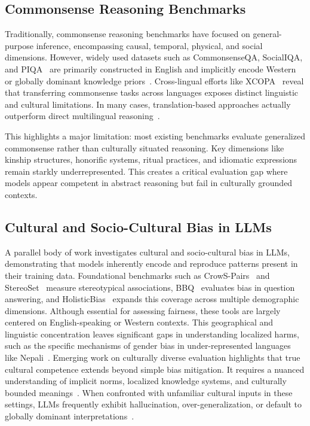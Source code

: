 \documentclass[10pt, a4paper]{article}
\begin{document}
\subsection{Commonsense Reasoning Benchmarks}
Traditionally, commonsense reasoning benchmarks have focused on general-purpose inference, encompassing causal, temporal, physical, and social dimensions. However, widely used datasets such as CommonsenseQA, SocialIQA, and PIQA~\cite{sap2019social} are primarily constructed in English and implicitly encode Western or globally dominant knowledge priors~\cite{toroghi2025llm}. Cross-lingual efforts like XCOPA~\cite{ponti2020xcopa} reveal that transferring commonsense tasks across languages exposes distinct linguistic and cultural limitations. In many cases, translation-based approaches actually outperform direct multilingual reasoning~\cite{parashar2025inference}.

This highlights a major limitation: most existing benchmarks evaluate generalized commonsense rather than culturally situated reasoning. Key dimensions like kinship structures, honorific systems, ritual practices, and idiomatic expressions remain starkly underrepresented. This creates a critical evaluation gap where models appear competent in abstract reasoning but fail in culturally grounded contexts.

\subsection{Cultural and Socio-Cultural Bias in LLMs}

A parallel body of work investigates cultural and socio-cultural bias in LLMs, demonstrating that models inherently encode and reproduce patterns present in their training data. Foundational benchmarks such as CrowS-Pairs~\cite{nangia2020crows} and StereoSet~\cite{nadeem2021stereoset} measure stereotypical associations, BBQ~\cite{parrish2022bbq} evaluates bias in question answering, and HolisticBias~\cite{zake2023holistic} expands this coverage across multiple demographic dimensions. Although essential for assessing fairness, these tools are largely centered on English-speaking or Western contexts. This geographical and linguistic concentration leaves significant gaps in understanding localized harms, such as the specific mechanisms of gender bias in under-represented languages like Nepali~\cite{khadka2025gender}. Emerging work on culturally diverse evaluation highlights that true cultural competence extends beyond simple bias mitigation. It requires a nuanced understanding of implicit norms, localized knowledge systems, and culturally bounded meanings~\cite{piaobeyond}. When confronted with unfamiliar cultural inputs in these settings, LLMs frequently exhibit hallucination, over-generalization, or default to globally dominant interpretations~\cite{peters2022generalization}.
\end{document}
